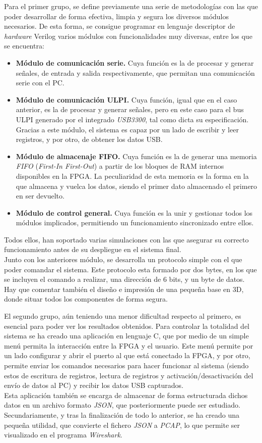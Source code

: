 \begin{resumen}
Para el primer grupo, se define previamente una serie de metodologías con las que poder desarrollar de forma efectiva, limpia y segura los diversos módulos necesarios. De esta forma, se consigue programar en lenguaje descriptor de \emph{hardware} Verilog varios módulos con funcionalidades muy diversas, entre los que se encuentra:
\begin{itemize}
    \item \textbf{Módulo de comunicación serie.} Cuya función es la de procesar y generar señales, de entrada y salida respectivamente, que permitan una comunicación serie con el PC.
    \item \textbf{Módulo de comunicación ULPI.} Cuya función, igual que en el caso anterior, es la de procesar y generar señales, pero en este caso para el bus ULPI generado por el integrado \emph{USB3300}, tal como dicta su especificación. Gracias a este módulo, el sistema es capaz por un lado de escribir y leer registros, y por otro, de obtener los datos USB.
    \item \textbf{Módulo de almacenaje FIFO.} Cuya función es la de generar una memoria \emph{FIFO} (\emph{First-In First-Out}) a partir de los bloques de RAM internos disponibles en la FPGA. La peculiaridad de esta memoria es la forma en la que almacena y vuelca los datos, siendo el primer dato almacenado el primero en ser devuelto.
    \item \textbf{Módulo de control general.} Cuya función es la unir y gestionar todos los módulos implicados, permitiendo un funcionamiento sincronizado entre ellos.
\end{itemize}
Todos ellos, han soportado varias simulaciones con las que asegurar su correcto funcionamiento antes de su despliegue en el sistema final. \\
Junto con los anteriores módulo, se desarrolla un protocolo simple con el que poder comandar el sistema. Este protocolo esta formado por dos bytes, en los que se incluyen el comando a realizar, una dirección de 6 bits, y un byte de datos. \\
Hay que comentar también el diseño e impresión de una pequeña base en 3D, donde situar todos los componentes de forma segura.

El segundo grupo, aún teniendo una menor dificultad respecto al primero, es esencial para poder ver los resultados obtenidos. Para controlar la totalidad del sistema se ha creado una aplicación en lenguaje C, que por medio de un simple menú permita la interacción entre la FPGA y el usuario. Este menú permite por un lado configurar y abrir el puerto al que está conectado la FPGA, y por otro, permite enviar los comandos necesarios para hacer funcionar al sistema (siendo estos de escritura de registros, lectura de registros y activación/desactivación del envío de datos al PC) y recibir los datos USB capturados. \\
Esta aplicación también se encarga de almacenar de forma estructurada dichos datos en un archivo formato \emph{JSON}, que posteriormente puede ser estudiado. Secundariamente, y tras la finalización de todo lo anterior, se ha creado una pequeña utilidad, que convierte el fichero \emph{JSON} a \emph{PCAP}, lo que permite ser visualizado en el programa \emph{Wireshark}.


\end{resumen}
